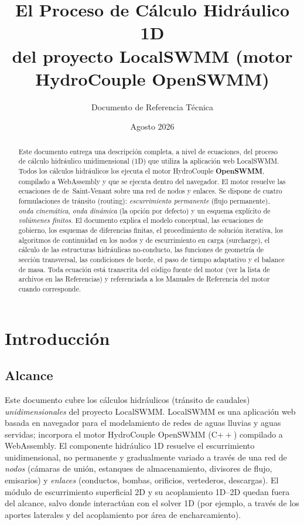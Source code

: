 \documentclass[11pt,a4paper]{article}
\title{\textbf{El Proceso de Cálculo Hidráulico 1D}\\[0.6em]
\large del proyecto LocalSWMM (motor HydroCouple OpenSWMM)}
\author{Documento de Referencia Técnica}
\date{Agosto 2026}
\begin{document}
\maketitle

\begin{abstract}
Este documento entrega una descripción completa, a nivel de ecuaciones, del
proceso de cálculo hidráulico unidimensional (1D) que utiliza la aplicación web
LocalSWMM. Todos los cálculos hidráulicos los ejecuta el motor HydroCouple
\textbf{OpenSWMM}, compilado a WebAssembly y que se ejecuta dentro del
navegador. El motor resuelve las ecuaciones de de~Saint-Venant sobre una red de
nodos y enlaces. Se dispone de cuatro formulaciones de tránsito (routing):
\emph{escurrimiento permanente} (flujo permanente), \emph{onda cinemática},
\emph{onda dinámica} (la opción por defecto) y un esquema explícito de
\emph{volúmenes finitos}. El documento explica el modelo conceptual, las
ecuaciones de gobierno, los esquemas de diferencias finitas, el procedimiento
de solución iterativa, los algoritmos de continuidad en los nodos y de
escurrimiento en carga (surcharge), el cálculo de las estructuras hidráulicas
no-conducto, las funciones de geometría de sección transversal, las
condiciones de borde, el paso de tiempo adaptativo y el balance de masa.
Toda ecuación está transcrita del código fuente del motor (ver la lista de
archivos en las Referencias) y referenciada a los Manuales de Referencia del
motor cuando corresponde.
\end{abstract}

\tableofcontents
\newpage

\section{Introducción}

\subsection{Alcance}

Este documento cubre los cálculos hidráulicos (tránsito de caudales)
\emph{unidimensionales} del proyecto LocalSWMM. LocalSWMM es una aplicación web
basada en navegador para el modelamiento de redes de aguas lluvias y aguas
servidas; incorpora el motor HydroCouple OpenSWMM (C$++$) compilado a
WebAssembly. El componente hidráulico 1D resuelve el escurrimiento
unidimensional, no permanente y gradualmente variado a través de una red de
\emph{nodos} (cámaras de unión, estanques de almacenamiento, divisores de
flujo, emisarios) y \emph{enlaces} (conductos, bombas, orificios, vertederos,
descargas). El módulo de escurrimiento superficial 2D y su acoplamiento 1D--2D
quedan fuera del alcance, salvo donde interactúan con el solver 1D (por
ejemplo, a través de los aportes laterales y del acoplamiento por área de
encharcamiento).
\end{document}
